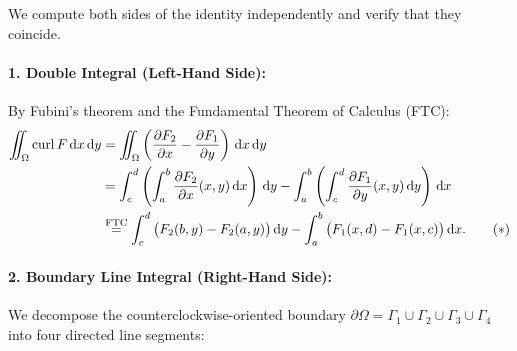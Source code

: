 \begin{demonstration}
We compute both sides of the identity independently and verify that they coincide.

\paragraph{1. Double Integral (Left-Hand Side):}
By Fubini's theorem and the Fundamental Theorem of Calculus (FTC):
\begin{align}
    \iint_{\Omega} \operatorname{curl} F \dx\dy &= \iint_{\Omega} \left( \pdv{F_2}{x} - \pdv{F_1}{y} \right) \dx\dy \nonumber \\
    &= \int_{c}^{d} \left( \int_{a}^{b} \pdv{F_2}{x}(x,y) \dx \right) \dy - \int_{a}^{b} \left( \int_{c}^{d} \pdv{F_1}{y}(x,y) \dy \right) \dx \nonumber \\
    &\overset{\text{FTC}}{=} \int_{c}^{d} \big( F_2(b,y) - F_2(a,y) \big) \dy - \int_{a}^{b} \big( F_1(x,d) - F_1(x,c) \big) \dx. \tag{$*$}
\end{align}

\paragraph{2. Boundary Line Integral (Right-Hand Side):}
We decompose the counterclockwise-oriented boundary $\partial\Omega = \Gamma_1 \cup \Gamma_2 \cup \Gamma_3 \cup \Gamma_4$ into four directed line segments:
\begin{center}
\end{center}
\end{demonstration}

